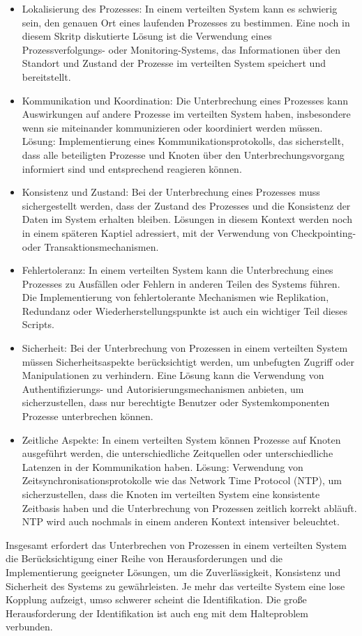 \documentclass[../vs-script-first-v01.tex]{subfiles}
\begin{document}
\begin{itemize}
\item Lokalisierung des Prozesses: In einem verteilten System kann es schwierig sein, den genauen Ort eines laufenden Prozesses zu bestimmen. Eine noch in diesem Skritp diskutierte Lösung ist die Verwendung eines Prozessverfolgungs- oder Monitoring-Systems, das Informationen über den Standort und Zustand der Prozesse im verteilten System speichert und bereitstellt.
\item Kommunikation und Koordination: Die Unterbrechung eines Prozesses kann Auswirkungen auf andere Prozesse im verteilten System haben, insbesondere wenn sie miteinander kommunizieren oder koordiniert werden müssen. Lösung: Implementierung eines Kommunikationsprotokolls, das sicherstellt, dass alle beteiligten Prozesse und Knoten über den Unterbrechungsvorgang informiert sind und entsprechend reagieren können.
\item Konsistenz und Zustand: Bei der Unterbrechung eines Prozesses muss sichergestellt werden, dass der Zustand des Prozesses und die Konsistenz der Daten im System erhalten bleiben. Lösungen in diesem Kontext werden noch in einem späteren Kaptiel adressiert, mit der  Verwendung von Checkpointing- oder Transaktionsmechanismen.
\item Fehlertoleranz: In einem verteilten System kann die Unterbrechung eines Prozesses zu Ausfällen oder Fehlern in anderen Teilen des Systems führen. Die Implementierung von fehlertolerante Mechanismen wie Replikation, Redundanz oder Wiederherstellungspunkte ist auch ein wichtiger Teil dieses Scripts.
\item Sicherheit: Bei der Unterbrechung von Prozessen in einem verteilten System müssen Sicherheitsaspekte berücksichtigt werden, um unbefugten Zugriff oder Manipulationen zu verhindern. Eine Lösung kann die Verwendung von Authentifizierungs- und Autorisierungsmechanismen anbieten, um sicherzustellen, dass nur berechtigte Benutzer oder Systemkomponenten Prozesse unterbrechen können.
\item Zeitliche Aspekte: In einem verteilten System können Prozesse auf Knoten ausgeführt werden, die unterschiedliche Zeitquellen oder unterschiedliche Latenzen in der Kommunikation haben. Lösung: Verwendung von Zeitsynchronisationsprotokolle wie das Network Time Protocol (NTP), um sicherzustellen, dass die Knoten im verteilten System eine konsistente Zeitbasis haben und die Unterbrechung von Prozessen zeitlich korrekt abläuft. NTP wird auch nochmals in einem anderen Kontext intensiver beleuchtet.
\end{itemize}
Insgesamt erfordert das Unterbrechen von Prozessen in einem verteilten System die Berücksichtigung einer Reihe von Herausforderungen und die Implementierung geeigneter Lösungen, um die Zuverlässigkeit, Konsistenz und Sicherheit des Systems zu gewährleisten. Je mehr das verteilte System eine lose Kopplung aufzeigt, umso schwerer scheint die Identifikation. Die große Herausforderung der Identifikation ist auch eng mit dem Halteproblem verbunden.
\end{document}
